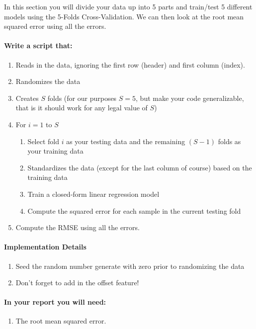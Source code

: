 \documentclass[12pt]{article}
\begin{document}
\noindent
In this section you will divide your data up into 5 parts and train/test 5 different models using the 5-Folds Cross-Validation.  We can then look at the root mean squared error using all the errors.\\

\paragraph{Write a script that:}
\begin{enumerate}
  \item Reads in the data, ignoring the first row (header) and first column (index).
  \item Randomizes the data
  \item Creates $S$ folds (for our purposes $S=5$, but make your code generalizable, that is it should work for any legal value of $S$)
  \item For $i=1$ to $S$
  \begin{enumerate}
  	\item Select fold $i$ as your testing data and the remaining $(S-1)$ folds as your training data
	\item Standardizes the data (except for the last column of course) based on the training data
	\item Train a closed-form linear regression model
  	\item Compute the squared error for each sample in the current testing fold
  \end{enumerate}
  \item Compute the RMSE using all the errors.
\end{enumerate}


\paragraph{Implementation Details}
\begin{enumerate}
\item Seed the random number generate with zero prior to randomizing the data
\item Don't forget to add in the offset feature!
\end{enumerate}


\paragraph{In your report you will need:}
\begin{enumerate}
\item The root mean squared error.
\end{enumerate}
\end{document}
